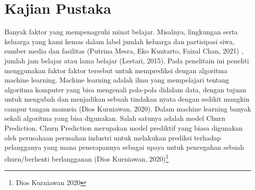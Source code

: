 \section{Kajian Pustaka}

Banyak faktor yang mempenagruhi minat belajar. Misalnya, lingkungan serta  keluarga yang kami kemas dalam label jumlah keluarga dan partisipasi siwa, sumber media dan fasilitas (Putrina Mesra, Eko Kuntarto, Faizal Chan, 2021) \citep{sugiyono2013metode}, jumlah jam belajar atau lama belajar  (Lestari, 2015). Pada penelitain ini peneliti menggunakan faktor faktor tersebut untuk memprediksi dengan algoritma machine learning. Machine learning adalah ilmu yang mempelajari tentang algoritma komputer yang bisa mengenali pola-pola didalam data, dengan tujuan untuk mengubah dan menjadikan sebuah tindakan nyata dengan sedikit mungkin campur tangan manusia (Dios Kurniawan, 2020). Dalam machine learning banyak sekali algoritma yang bisa digunakan.  Salah satunya adalah model Churn Prediction. Churn Prediction merupakan model prediktif yang biasa digunakan oleh perusahaan perusahan industri untuk melakukan prediksi terhadap pelangganya yang mana penerapannya sebagai upaya untuk pencegahan sebuah churn/berhenti berlangganan (Dios Kurniawan, 2020)\footnote{Dios Kurniawan 2020}\citep{machinelearning}
